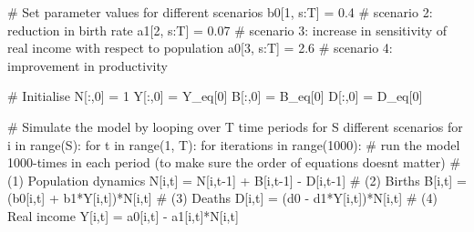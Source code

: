 \documentclass[
  letterpaper,
  DIV=11,
  numbers=noendperiod]{scrreprt}
\newenvironment{Shaded}{\begin{snugshade}}{\end{snugshade}}
\newcommand{\BuiltInTok}[1]{\textcolor[rgb]{0.00,0.23,0.31}{#1}}
\newcommand{\CommentTok}[1]{\textcolor[rgb]{0.37,0.37,0.37}{#1}}
\newcommand{\ControlFlowTok}[1]{\textcolor[rgb]{0.00,0.23,0.31}{#1}}
\newcommand{\DecValTok}[1]{\textcolor[rgb]{0.68,0.00,0.00}{#1}}
\newcommand{\FloatTok}[1]{\textcolor[rgb]{0.68,0.00,0.00}{#1}}
\newcommand{\KeywordTok}[1]{\textcolor[rgb]{0.00,0.23,0.31}{#1}}
\newcommand{\NormalTok}[1]{\textcolor[rgb]{0.00,0.23,0.31}{#1}}
\newcommand{\OperatorTok}[1]{\textcolor[rgb]{0.37,0.37,0.37}{#1}}
\begin{document}
\begin{tcolorbox}
\begin{Shaded}
\begin{Highlighting}[]
\CommentTok{\# Set parameter values for different scenarios}
\NormalTok{b0[}\DecValTok{1}\NormalTok{, s:T] }\OperatorTok{=} \FloatTok{0.4}  \CommentTok{\# scenario 2: reduction in birth rate}
\NormalTok{a1[}\DecValTok{2}\NormalTok{, s:T] }\OperatorTok{=} \FloatTok{0.07}  \CommentTok{\# scenario 3: increase in sensitivity of real income with respect to population}
\NormalTok{a0[}\DecValTok{3}\NormalTok{, s:T] }\OperatorTok{=} \FloatTok{2.6}  \CommentTok{\# scenario 4: improvement in productivity}

\CommentTok{\# Initialise }
\NormalTok{N[:,}\DecValTok{0}\NormalTok{] }\OperatorTok{=} \DecValTok{1}
\NormalTok{Y[:,}\DecValTok{0}\NormalTok{] }\OperatorTok{=}\NormalTok{ Y\_eq[}\DecValTok{0}\NormalTok{]}
\NormalTok{B[:,}\DecValTok{0}\NormalTok{] }\OperatorTok{=}\NormalTok{ B\_eq[}\DecValTok{0}\NormalTok{]}
\NormalTok{D[:,}\DecValTok{0}\NormalTok{] }\OperatorTok{=}\NormalTok{ D\_eq[}\DecValTok{0}\NormalTok{]}

\CommentTok{\# Simulate the model by looping over T time periods for S different scenarios}
\ControlFlowTok{for}\NormalTok{ i }\KeywordTok{in} \BuiltInTok{range}\NormalTok{(S):  }
  \ControlFlowTok{for}\NormalTok{ t }\KeywordTok{in} \BuiltInTok{range}\NormalTok{(}\DecValTok{1}\NormalTok{, T):}
    \ControlFlowTok{for}\NormalTok{ iterations }\KeywordTok{in} \BuiltInTok{range}\NormalTok{(}\DecValTok{1000}\NormalTok{): }\CommentTok{\# run the model 1000{-}times in each period (to make sure the order of equations doesn\textquotesingle{}t matter)}
      \CommentTok{\# (1) Population dynamics    }
\NormalTok{      N[i,t] }\OperatorTok{=}\NormalTok{ N[i,t}\OperatorTok{{-}}\DecValTok{1}\NormalTok{] }\OperatorTok{+}\NormalTok{ B[i,t}\OperatorTok{{-}}\DecValTok{1}\NormalTok{] }\OperatorTok{{-}}\NormalTok{ D[i,t}\OperatorTok{{-}}\DecValTok{1}\NormalTok{]}
      \CommentTok{\# (2) Births}
\NormalTok{      B[i,t] }\OperatorTok{=}\NormalTok{ (b0[i,t] }\OperatorTok{+}\NormalTok{ b1}\OperatorTok{*}\NormalTok{Y[i,t])}\OperatorTok{*}\NormalTok{N[i,t]}
      \CommentTok{\# (3) Deaths}
\NormalTok{      D[i,t] }\OperatorTok{=}\NormalTok{ (d0 }\OperatorTok{{-}}\NormalTok{ d1}\OperatorTok{*}\NormalTok{Y[i,t])}\OperatorTok{*}\NormalTok{N[i,t]  }
      \CommentTok{\# (4) Real income}
\NormalTok{      Y[i,t] }\OperatorTok{=}\NormalTok{ a0[i,t] }\OperatorTok{{-}}\NormalTok{ a1[i,t]}\OperatorTok{*}\NormalTok{N[i,t]   }
\end{Highlighting}
\end{Shaded}

\end{tcolorbox}
\end{document}
